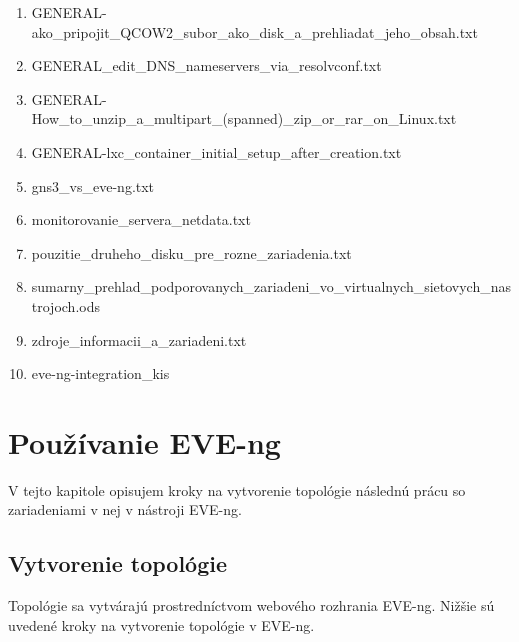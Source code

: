 \begin{enumerate}[noitemsep,label*=\thesection.\arabic*.]
    \item GENERAL-ako\_pripojit\_QCOW2\_subor\_ako\_disk\_a\_prehliadat\_jeho\_obsah.txt
    \item GENERAL\_edit\_DNS\_nameservers\_via\_resolvconf.txt
    \item GENERAL-How\_to\_unzip\_a\_multipart\_(spanned)\_zip\_or\_rar\_on\_Linux.txt
    \item GENERAL-lxc\_container\_initial\_setup\_after\_creation.txt
    \item gns3\_vs\_eve-ng.txt
    \item \label{item:monitorovanie} monitorovanie\_servera\_netdata.txt
    \item pouzitie\_druheho\_disku\_pre\_rozne\_zariadenia.txt
    \item \label{item:sumarny_prehlad_zariadeni} sumarny\_prehlad\_podporovanych\_zariadeni\_vo\_virtualnych\_sietovych\_nastrojoch.ods
    \item zdroje\_informacii\_a\_zariadeni.txt
    \item \label{item:upraveny_integracny_balicek_win} eve-ng-integration\_kis
\end{enumerate}





\newpage

\section{Používanie EVE-ng}
\label{chap:pouzivanie_eve_ng}

V tejto kapitole opisujem kroky na vytvorenie topológie následnú prácu so zariadeniami v nej v nástroji EVE-ng.




\subsection{Vytvorenie topológie}
\label{chap:vytvorenie_topo_eve-ng}
Topológie sa vytvárajú prostredníctvom webového rozhrania EVE-ng. Nižšie sú uvedené kroky na vytvorenie topológie v EVE-ng.


